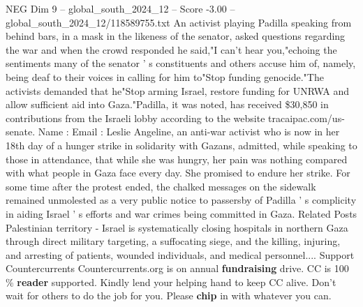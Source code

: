 \begin{textsample}{NEG Dim 9 – global\_south\_2024\_12 – Score -3.00 – global\_south\_2024\_12/118589755.txt}
An activist playing Padilla speaking from behind bars, in a mask in the likeness of the senator, asked questions regarding the war and when the crowd responded he said,"I can't hear you,"echoing the sentiments many of the senator ' s constituents and others accuse him of, namely, being deaf to their voices in calling for him to"Stop funding genocide."The activists demanded that he"Stop arming Israel, restore funding for UNRWA and allow sufficient aid into Gaza."Padilla, it was noted, has received \$30,850 in contributions from the Israeli lobby according to the website tracaipac.com/us-senate.
Name : Email : Leslie Angeline, an anti-war activist who is now in her 18th day of a hunger strike in solidarity with Gazans, admitted, while speaking to those in attendance, that while she was hungry, her pain was nothing compared with what people in Gaza face every day.
She promised to endure her strike.
For some time after the protest ended, the chalked messages on the sidewalk remained unmolested as a very public notice to passersby of Padilla ' s complicity in aiding Israel ' s efforts and war crimes being committed in Gaza.
Related Posts Palestinian territory - Israel is systematically closing hospitals in northern Gaza through direct military targeting, a suffocating siege, and the killing, injuring, and arresting of patients, wounded individuals, and medical personnel....
Support Countercurrents Countercurrents.org is on annual \textbf{fundraising} drive.
CC is 100 \% \textbf{reader} supported.
Kindly lend your helping hand to keep CC alive.
Don't wait for others to do the job for you.
Please \textbf{chip} in with whatever you can.

\end{textsample}
